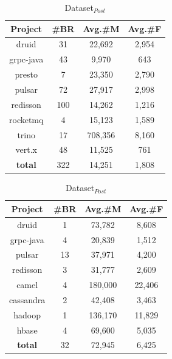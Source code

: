 \begin{table}[t]\footnotesize
\centering
\begin{minipage}{0.48\linewidth}
\centering
\caption{Dataset$_{Git}$}
\label{table:git1}
\begin{tabular}{c|ccc}
\toprule
Project & \#BR & Avg.\#M & Avg.\#F \\ \hline
druid  & 31      & 22,692      &  2,954        \\ 
grpc-java    &  43     & 9,970      & 643       \\ 
presto    &  7     &  23,350     &  2,790         \\ 
pulsar    &  72     &  27,917     & 2,998          \\ 
redisson    & 100       &  14,262     & 1,216          \\ 
rocketmq    & 4      & 15,123      & 1,589         \\ 
trino    & 17      &  708,356     & 8,160          \\ 
vert.x     & 48      &  11,525     & 761    \\ 
\textbf{total}     & 322      &  14,251  &  1,808   \\ 
\bottomrule
\end{tabular}
\end{minipage}
\hfill
\begin{minipage}{0.48\linewidth}
\centering
\caption{Dataset$_{Post}$}
\label{table:git2}
\begin{tabular}{c|ccc}
\toprule
Project & \#BR & Avg.\#M & Avg.\#F \\ \hline
druid  & 1      & 73,782      & 8,608         \\ 
grpc-java    & 4      & 20,839      & 1,512       \\ 
pulsar    & 13      & 37,971      &  4,200         \\ 
redisson    & 3      & 31,777      & 2,609          \\ 
camel    & 4      & 180,000      & 22,406          \\ 
cassandra    & 2      & 42,408     & 3,463          \\ 
hadoop     & 1      & 136,170      & 11,829    \\ 
hbase     & 4      &  69,600     & 5,035    \\ 
\textbf{total}    & 32      & 72,945      &  6,425   \\ 
\bottomrule
\end{tabular}
\end{minipage}
\end{table}
\vspace{-0.5em}